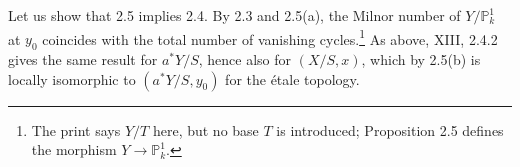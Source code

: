 Let us show that 2.5 implies 2.4.  By 2.3 and 2.5(a), the Milnor
number of $Y/\mathbb P^1_k$ at $y_0$ coincides with the total number
of vanishing cycles.\footnote{The print says $Y/T$ here, but no base
$T$ is introduced; Proposition 2.5 defines the morphism
$Y\to\mathbb P^1_k$.}
As above, XIII, 2.4.2 gives the same result for $a^*Y/S$, hence also
for $(X/S,x)$, which by 2.5(b) is locally isomorphic to
$(a^*Y/S,y_0)$ for the \'etale topology.
